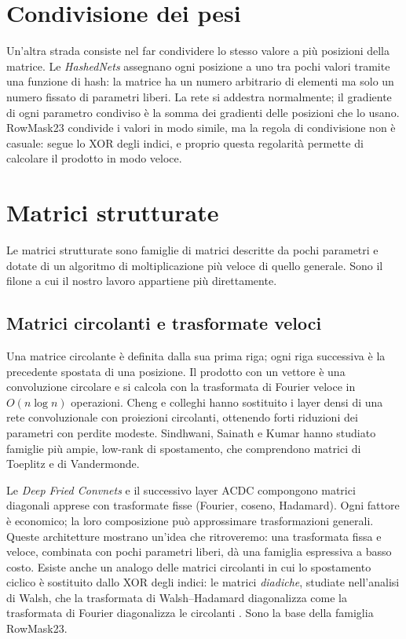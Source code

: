 \section{Condivisione dei pesi}

Un'altra strada consiste nel far condividere lo stesso valore a più posizioni della matrice. Le \emph{HashedNets} \cite{chen2015compressing} assegnano ogni posizione a uno tra pochi valori tramite una funzione di hash: la matrice ha un numero arbitrario di elementi ma solo un numero fissato di parametri liberi. La rete si addestra normalmente; il gradiente di ogni parametro condiviso è la somma dei gradienti delle posizioni che lo usano. RowMask23 condivide i valori in modo simile, ma la regola di condivisione non è casuale: segue lo XOR degli indici, e proprio questa regolarità permette di calcolare il prodotto in modo veloce.

\section{Matrici strutturate}

Le matrici strutturate sono famiglie di matrici descritte da pochi parametri e dotate di un algoritmo di moltiplicazione più veloce di quello generale. Sono il filone a cui il nostro lavoro appartiene più direttamente.

\subsection{Matrici circolanti e trasformate veloci}

Una matrice circolante è definita dalla sua prima riga; ogni riga successiva è la precedente spostata di una posizione. Il prodotto con un vettore è una convoluzione circolare e si calcola con la trasformata di Fourier veloce in $O(n\log n)$ operazioni. Cheng e colleghi \cite{cheng2015exploration} hanno sostituito i layer densi di una rete convoluzionale con proiezioni circolanti, ottenendo forti riduzioni dei parametri con perdite modeste. Sindhwani, Sainath e Kumar \cite{sindhwani2015structured} hanno studiato famiglie più ampie, low-rank di spostamento, che comprendono matrici di Toeplitz e di Vandermonde.

Le \emph{Deep Fried Convnets} \cite{yang2015deep} e il successivo layer ACDC \cite{moczulski2016acdc} compongono matrici diagonali apprese con trasformate fisse (Fourier, coseno, Hadamard). Ogni fattore è economico; la loro composizione può approssimare trasformazioni generali. Queste architetture mostrano un'idea che ritroveremo: una trasformata fissa e veloce, combinata con pochi parametri liberi, dà una famiglia espressiva a basso costo. Esiste anche un analogo delle matrici circolanti in cui lo spostamento ciclico è sostituito dallo XOR degli indici: le matrici \emph{diadiche}, studiate nell'analisi di Walsh, che la trasformata di Walsh--Hadamard diagonalizza come la trasformata di Fourier diagonalizza le circolanti \cite{fino1976unified,beauchamp1984applications}. Sono la base della famiglia RowMask23.

